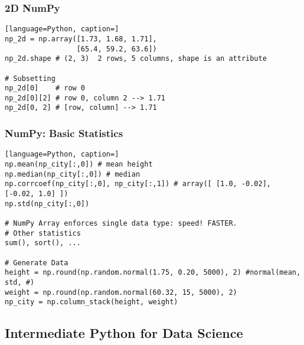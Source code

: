 \documentclass[12pt]{article}
\begin{document}
\subsubsection{\normalsize 2D NumPy}
\begin{lstlisting}[language=Python, caption=]
np_2d = np.array([1.73, 1.68, 1.71], 
                 [65.4, 59.2, 63.6])
np_2d.shape # (2, 3)  2 rows, 5 columns, shape is an attribute

# Subsetting
np_2d[0]    # row 0
np_2d[0][2] # row 0, column 2 --> 1.71
np_2d[0, 2] # [row, column] --> 1.71
\end{lstlisting}

\subsubsection{\normalsize NumPy: Basic Statistics}
\begin{lstlisting}[language=Python, caption=]
np.mean(np_city[:,0]) # mean height
np.median(np_city[:,0]) # median
np.corrcoef(np_city[:,0], np_city[:,1]) # array([ [1.0, -0.02], [-0.02, 1.0] ])
np.std(np_city[:,0]) 

# NumPy Array enforces single data type: speed! FASTER.
# Other statistics
sum(), sort(), ...

# Generate Data
height = np.round(np.random.normal(1.75, 0.20, 5000), 2) #normal(mean, std, #)
weight = np.round(np.random.normal(60.32, 15, 5000), 2)
np_city = np.column_stack(height, weight)
\end{lstlisting}



\newpage
\subsection{\large Intermediate Python for Data Science}
\end{document}
